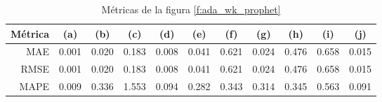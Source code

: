 \documentclass[a4paper,10pt]{article}
\begin{document}
\begin{table}[h!]
 \begin{center}
  \begin{tabular}{|r|c|c|c|c|c|c|c|c|c|c|}
    Métrica & (a) & (b) & (c) & (d) & (e) & (f) & (g) & (h) & (i) & (j) \\ \hline
    MAE & 0.001 & 0.020 & 0.183 & 0.008 & 0.041 & 0.621 & 0.024 & 0.476 & 0.658 & 0.015 \\
    RMSE & 0.001 & 0.020 & 0.183 & 0.008 & 0.041 & 0.621 & 0.024 & 0.476 & 0.658 & 0.015 \\
    MAPE & 0.009 & 0.336 & 1.553 & 0.094 & 0.282 & 0.343 & 0.314 & 0.345 & 0.563 & 0.091 \\ \hline
  \end{tabular}
  \caption{Métricas de la figura \ref{f:ada_wk_prophet}}
  \label{tab:ada_prophet_wk}
 \end{center}
\end{table}
\end{document}
